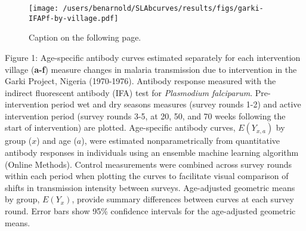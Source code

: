 \documentclass[11pt]{article}
\begin{document}
\clearpage
\begin{figure}[htbp]
\begin{center}
\texttt{[image: /users/benarnold/SLAbcurves/results/figs/garki-IFAPf-by-village.pdf]}
\begin{minipage}{\textwidth}
\caption{Caption on the following page.}
\label{fig:garkiVillageEy}
\end{minipage}
\end{center}
\end{figure}
\clearpage
Figure 1: Age-specific antibody curves estimated separately for each intervention village (\textbf{a-f}) measure changes in malaria transmission due to intervention in the Garki Project, Nigeria (1970-1976).  Antibody response measured with the indirect fluorescent antibody (IFA) test for \textit{Plasmodium falciparum}. Pre-intervention period wet and dry seasons measures (survey rounds 1-2) and active intervention period (survey rounds 3-5, at 20, 50, and 70 weeks following the start of intervention) are plotted.  Age-specific antibody curves, $E(Y_{x,a})$ by group ($x$) and age ($a$), were estimated nonparametrically from quantitative antibody responses in individuals using an ensemble machine learning algorithm (Online Methods). Control measurements were combined across survey rounds within each period when plotting the curves to facilitate visual comparison of shifts in transmission intensity between surveys. Age-adjusted geometric means by group, $E(Y_x)$, provide summary differences between curves at each survey round. Error bars show 95\% confidence intervals for the age-adjusted geometric means.
\end{document}
